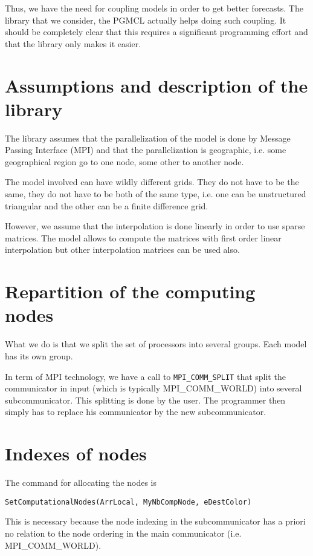 \documentclass[12pt]{article}
\begin{document}
Thus, we have the need for coupling models in order to get better forecasts. The library that we consider, the PGMCL actually helps doing such coupling. It should be completely clear that this requires a significant programming effort and that the library only makes it easier.

\section{Assumptions and description of the library}

The library assumes that the parallelization of the model is done by Message Passing Interface (MPI) and that the parallelization is geographic, i.e. some geographical region go to one node, some other to another node.

The model involved can have wildly different grids. They do not have to be the same, they do not have to be both of the same type, i.e. one can be unstructured triangular and the other can be a finite difference grid.

However, we assume that the interpolation is done linearly in order to use sparse matrices. The model allows
to compute the matrices with first order linear interpolation but other interpolation matrices can be used
also.

\section{Repartition of the computing nodes}

What we do is that we split the set of processors into several groups. Each model has its own group.

In term of MPI technology, we have a call to {\tt MPI\_COMM\_SPLIT} that split the communicator in input (which is typically MPI\_COMM\_WORLD) into several subcommunicator. This splitting is done by the user.
The programmer then simply has to replace his communicator by the new subcommunicator.

\section{Indexes of nodes}

The command for allocating the nodes is
\begin{verbatim}
SetComputationalNodes(ArrLocal, MyNbCompNode, eDestColor)
\end{verbatim}
This is necessary because the node indexing in the subcommunicator has a priori no relation to the node
ordering in the main communicator (i.e. MPI\_COMM\_WORLD).
\end{document}
